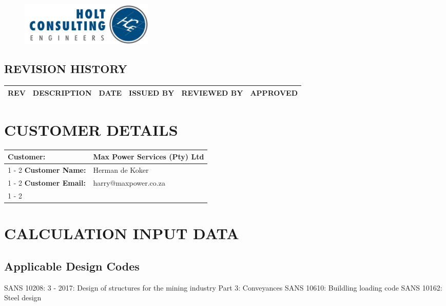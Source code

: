 \documentclass{article}%
\begin{document}
\begin{figure}[h!]%
\includegraphics[width=240px]{HCE.jpg}%
\centering%
\end{figure}

%
\newpage%
\begin{center}%
\section*{REVISION HISTORY}%
\label{sec:REVISIONHISTORY}%

%
\begin{minipage}{\textwidth}%
\centering%
\begin{tabular}{|c |c |c |c |c |c |}%
\hline%
\textbf{REV}&\textbf{DESCRIPTION}&\textbf{DATE}&\textbf{ISSUED BY}&\textbf{REVIEWED BY}&\textbf{APPROVED}\\%
\hline%
\end{tabular}%
\end{minipage}%
\end{center}%
\newpage%
\section{CUSTOMER DETAILS}%
\label{sec:CUSTOMERDETAILS}%
\begin{flushleft}%
\begin{minipage}{\textwidth}%
\centering%
\begin{tabular}{|l |l |}%
\hline%
\textbf{Customer:}&Max Power Services (Pty) Ltd\\%
\cline{1%
-%
2}%
\textbf{Customer Name:}&Herman de Koker\\%
\cline{1%
-%
2}%
\textbf{Customer Email:}&harry@maxpower.co.za\\%
\cline{1%
-%
2}%
\end{tabular}%
\end{minipage}%
\end{flushleft}

%
\newpage%
\section{CALCULATION INPUT DATA}%
\label{sec:CALCULATIONINPUTDATA}%
\subsection{Applicable Design Codes}%
\label{subsec:ApplicableDesignCodes}%
\begin{flushleft}%
SANS 10208: 3 {-} 2017: Design of structures for the mining industry Part 3: Conveyances%
\linebreak%
SANS 10610: Buildling loading code%
\linebreak%
SANS 10162: Steel design%
\linebreak%
\end{flushleft}
\end{document}
